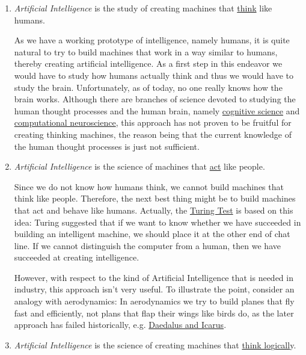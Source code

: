 \begin{enumerate}
\item \emph{Artificial Intelligence} is the study of creating machines that \underline{think} like humans.

      As we have a working prototype of intelligence, namely humans, it is quite natural to try to
      build machines that work in a way similar to humans, thereby creating artificial
      intelligence.  As a first step in this endeavor we would have to study how humans actually
      think and thus we would have to study the brain.  Unfortunately, as of today, no one really
      knows how the brain works.  Although there are branches of science devoted to studying the
      human thought processes and the human brain, namely
      \href{https://en.wikipedia.org/wiki/Cognitive_science}{cognitive science} and 
      \href{https://en.wikipedia.org/wiki/Computational_neuroscience}{computational neuroscience},
      this approach has not proven to be fruitful for creating thinking machines, the reason being
      that the current knowledge of the human thought processes is just not sufficient.  

\item \emph{Artificial Intelligence} is the science of machines that \underline{act} like people.

      Since we do not know how humans think,  we cannot build machines that think like people.
      Therefore, the next best thing might be to build  machines that act and behave like humans.  
      Actually, the \href{https://en.wikipedia.org/wiki/Turing_test}{Turing Test} is based on this
      idea:  Turing suggested that if we want to know whether we have succeeded in building an
      intelligent machine, we should place it at the other end of chat line.  If we cannot
      distinguish the computer from a human, then we have succeeded at creating intelligence. 

      However, with respect to the kind of Artificial Intelligence that is needed in industry, this
      approach isn't very useful.  To illustrate the point, consider an analogy with aerodynamics:
      In aerodynamics we try to build planes that fly fast and efficiently, not plans that flap
      their wings like birds do, as the later approach has failed historically, e.g. 
      \href{https://en.wikipedia.org/wiki/Daedalus#Daedalus_and_Icarus}{Daedalus and Icarus}.
\item \emph{Artificial Intelligence} is the science of creating machines that \underline{think lo}g\underline{icall}y.


\end{enumerate}
